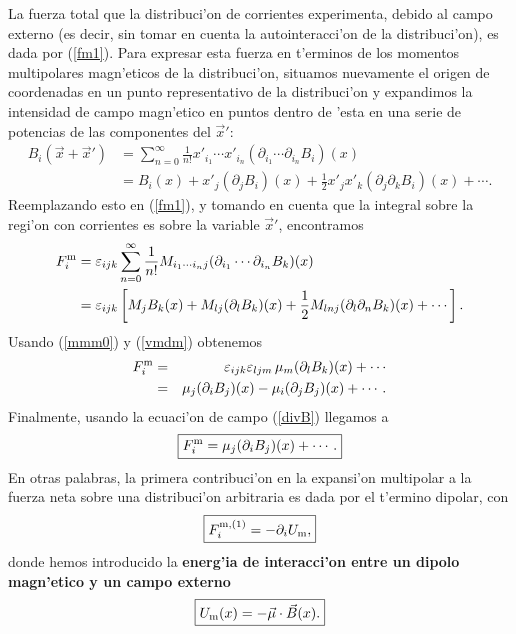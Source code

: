 La fuerza total que la distribuci'on de corrientes experimenta, debido al campo
externo (es decir, sin tomar en cuenta la autointeracci'on de la distribuci'on),
es dada por (\ref{fm1}). Para expresar esta fuerza en t'erminos de los momentos multipolares magn'eticos de la distribuci'on, situamos nuevamente el
origen de coordenadas en un punto representativo de la distribuci'on y expandimos la
intensidad de campo magn'etico en puntos dentro de 'esta en una serie
de potencias de las componentes del $\vec{x}'$:
\begin{align}
 B_i(\vec{x}+\vec{x}') &= \sum_{n=0}^\infty \frac{1}{n!}x'_{i_1}\cdots x'_{i_n}(\partial_{i_1}\cdots\partial_{i_n}B_i)(x) \label{expB} \\
 &= B_i(x)+x'_j(\partial_jB_i)(x) +
\frac{1}{2}x'_jx'_k(\partial_j\partial_kB_i)(x)+\cdots .
\end{align}
Reemplazando esto en (\ref{fm1}), y tomando en cuenta que la integral sobre la regi'on con corrientes es sobre la variable $\vec{x}'$, encontramos
\begin{align}
F^{\rm m}_i &=  \varepsilon_{ijk}\sum_{n=0}^\infty\frac{1}{n!}M_{i_1\cdots i_nj}(\partial_{i_1}\cdots\partial_{i_n}B_k)(x)\\
&= \varepsilon_{ijk}\left[M_jB_k(x)+M_{lj}(\partial_lB_k)(x)+\frac{1}{2}M_{lnj}(\partial_l\partial_nB_k)(x) +\cdots\right].
\end{align}
Usando (\ref{mmm0}) y (\ref{vmdm}) obtenemos
\begin{eqnarray}
F^{\rm m}_i
&=&\varepsilon_{ijk}\varepsilon_{ljm}\,\mu_m (\partial_lB_k)(x)+\cdots \\
&=& \mu_j(\partial_iB_j)(x)-\mu_i(\partial_jB_j)(x)+\cdots .
\end{eqnarray}
Finalmente, usando la ecuaci'on de campo (\ref{divB}) llegamos a
\begin{equation}
 \boxed{F^{\rm m}_i=\mu_j(\partial_iB_j)(x)+\cdots .}
\end{equation}
En otras palabras, la primera contribuci'on en la expansi'on multipolar a la
fuerza neta sobre una distribuci'on arbitraria es dada por el t'ermino dipolar,
con
\begin{equation}
 \boxed{F_i^{\rm m,(1)}=-\partial_i U_{\rm m}, }
\end{equation}
donde hemos introducido la \textbf{energ'ia de interacci'on entre un dipolo magn'etico
y un campo externo}
\begin{equation}
 \boxed{U_{\rm m}(x)=-\vec{\mu}\cdot\vec{B}(x).} \label{Umagdip}
\end{equation}


